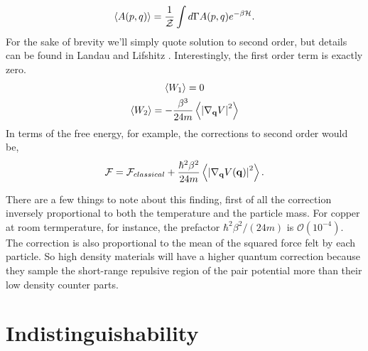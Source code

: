 %
\begin{equation} \langle A(p, q) \rangle = \frac{1}{\mathcal{Z}} \int d\Gamma A(p, q)
e^{-\beta \mathcal{H}}.  \end{equation}
%
For the sake of brevity we'll simply quote solution to second order, but
details can be found in Landau and Lifshitz \cite{LANDAU198079}.
Interestingly, the first order term is exactly zero.
%
\begin{gather} \left\langle W_1 \right\rangle= 0 \\ \left\langle W_2 \right\rangle = - \frac{\beta^3}{24 m} \left\langle \left\vert
\nabla_{\mathbf{q}} V \right\vert^2 \right\rangle \end{gather}
%
In terms of the free energy, for example, the corrections to second order would
be, 
%
\begin{equation}{\label{quantumcorr}} \mathcal{F} = \mathcal{F}_{classical} +
\frac{\hbar^2\beta^2}{24m} \left\langle  \left\vert \nabla_{\mathbf{q}} V(\mathbf{q}) \right\vert^2  \right\rangle.
\end{equation}

There are a few things to note about this finding, first of all the correction
inversely proportional to both the temperature and the particle mass.  For
copper at room termperature, for instance, the prefactor $\hbar^2\beta^2/(24
m)$ is $\mathcal{O}(10^{-4})$.  The correction is also proportional to the mean
of the squared force felt by each particle. So high density materials will have
a higher quantum correction because they sample the short-range repulsive
region of the pair potential more than their low density counter parts.

\section{Indistinguishability} %

